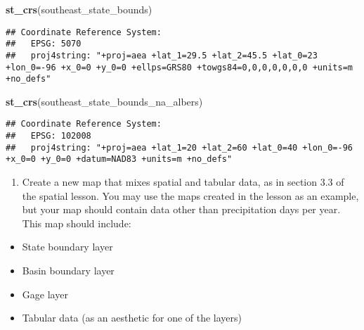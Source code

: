 \documentclass[]{article}
\newenvironment{Shaded}{\begin{snugshade}}{\end{snugshade}}
\newcommand{\KeywordTok}[1]{\textcolor[rgb]{0.13,0.29,0.53}{\textbf{#1}}}
\newcommand{\StringTok}[1]{\textcolor[rgb]{0.31,0.60,0.02}{#1}}
\newcommand{\CommentTok}[1]{\textcolor[rgb]{0.56,0.35,0.01}{\textit{#1}}}
\newcommand{\OperatorTok}[1]{\textcolor[rgb]{0.81,0.36,0.00}{\textbf{#1}}}
\newcommand{\NormalTok}[1]{#1}
\providecommand{\tightlist}{%
  \setlength{\itemsep}{0pt}\setlength{\parskip}{0pt}}
\begin{document}
\begin{Shaded}
\begin{Highlighting}[]
\KeywordTok{st_crs}\NormalTok{(southeast_state_bounds)}
\end{Highlighting}
\end{Shaded}

\begin{verbatim}
## Coordinate Reference System:
##   EPSG: 5070 
##   proj4string: "+proj=aea +lat_1=29.5 +lat_2=45.5 +lat_0=23 +lon_0=-96 +x_0=0 +y_0=0 +ellps=GRS80 +towgs84=0,0,0,0,0,0,0 +units=m +no_defs"
\end{verbatim}

\begin{Shaded}
\begin{Highlighting}[]
\KeywordTok{st_crs}\NormalTok{(southeast_state_bounds_na_albers)}
\end{Highlighting}
\end{Shaded}

\begin{verbatim}
## Coordinate Reference System:
##   EPSG: 102008 
##   proj4string: "+proj=aea +lat_1=20 +lat_2=60 +lat_0=40 +lon_0=-96 +x_0=0 +y_0=0 +datum=NAD83 +units=m +no_defs"
\end{verbatim}

\begin{enumerate}
\def\labelenumi{\arabic{enumi}.}
\setcounter{enumi}{1}
\tightlist
\item
  Create a new map that mixes spatial and tabular data, as in section
  3.3 of the spatial lesson. You may use the maps created in the lesson
  as an example, but your map should contain data other than
  precipitation days per year. This map should include:
\end{enumerate}

\begin{itemize}
\tightlist
\item
  State boundary layer
\item
  Basin boundary layer
\item
  Gage layer
\item
  Tabular data (as an aesthetic for one of the layers)
\end{itemize}

\begin{Shaded}
\end{Shaded}
\end{document}

